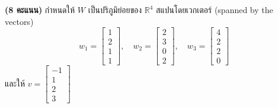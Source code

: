 \documentclass[12pt, a4paper]{exam}
\begin{document}
\begin{questions}
\question \textbf{(8 คะแนน)} กำหนดให้ $W$ เป็นปริภูมิย่อยของ $\mathbb{R}^4$ สแปนโดยเวกเตอร์ (spanned by the vectors)
\[
w_1 = \begin{bmatrix} 1 \\ 2 \\ 1 \\ 1 \end{bmatrix}, \quad
w_2 = \begin{bmatrix} 2 \\ 3 \\ 0 \\ 2 \end{bmatrix}, \quad
w_3 = \begin{bmatrix} 4 \\ 2 \\ 2 \\ 0 \end{bmatrix}
\]
และให้ $v = \begin{bmatrix} -1 \\ 1 \\ 2 \\ 3 \end{bmatrix}$

\end{questions}
\end{document}
